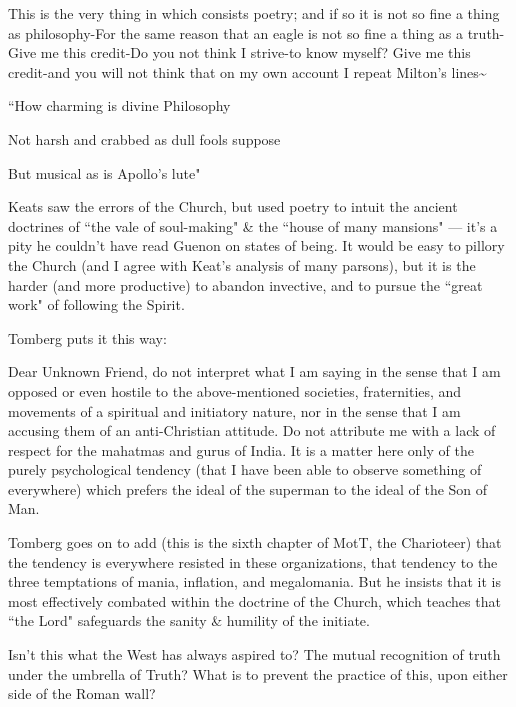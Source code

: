 \begin{quotex}
This is the very thing in which consists poetry; and if so it is not so fine a thing as philosophy-For the same reason that an eagle is not so fine a thing as a truth-Give me this credit-Do you not think I strive-to know myself? Give me this credit-and you will not think that on my own account I repeat Milton's lines\~{}

``How charming is divine Philosophy

Not harsh and crabbed as dull fools suppose

But musical as is Apollo's lute" 

\end{quotex}
Keats saw the errors of the Church, but used poetry to intuit the ancient doctrines of ``the vale of soul-making" \& the ``house of many mansions" — it's a pity he couldn't have read Guenon on states of being. It would be easy to pillory the Church (and I agree with Keat's analysis of many parsons), but it is the harder (and more productive) to abandon invective, and to pursue the ``great work" of following the Spirit.

Tomberg puts it this way:

\begin{quotex}
Dear Unknown Friend, do not interpret what I am saying in the sense that I am opposed or even hostile to the above-mentioned societies, fraternities, and movements of a spiritual and initiatory nature, nor in the sense that I am accusing them of an anti-Christian attitude. Do not attribute me with a lack of respect for the mahatmas and gurus of India. It is a matter here only of the purely psychological tendency (that I have been able to observe something of everywhere) which prefers the ideal of the superman to the ideal of the Son of Man. 

\end{quotex}
Tomberg goes on to add (this is the sixth chapter of MotT, the Charioteer) that the tendency is everywhere resisted in these organizations, that tendency to the three temptations of mania, inflation, and megalomania. But he insists that it is most effectively combated within the doctrine of the Church, which teaches that ``the Lord" safeguards the sanity \& humility of the initiate.

Isn't this what the West has always aspired to? The mutual recognition of truth under the umbrella of Truth? What is to prevent the practice of this, upon either side of the Roman wall?



